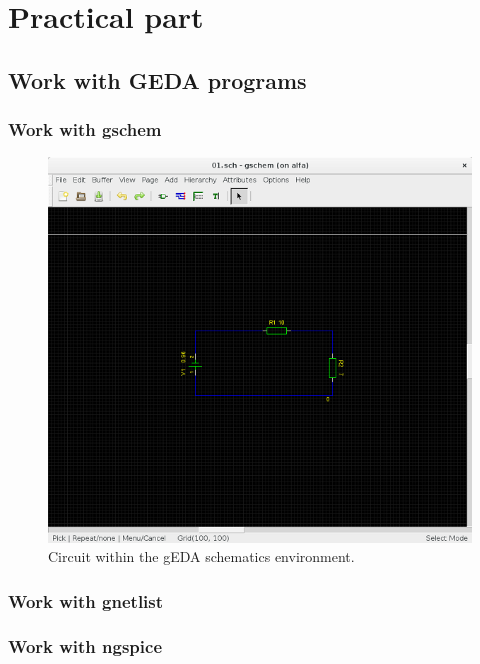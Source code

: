 \documentclass{report}
\begin{document}
\newpage
\chapter{Practical part}

\section{Work with GEDA programs}
\subsection{Work with gschem}


\begin{figure}[!ht]
\centering
\includegraphics[width=.83\linewidth]{geda}
\caption{Circuit within the gEDA schematics environment.}
\end{figure}
\vspace*{\floatsep}


\newpage
\subsection{Work with gnetlist}

\newpage

\subsection{Work with ngspice}
\end{document}
